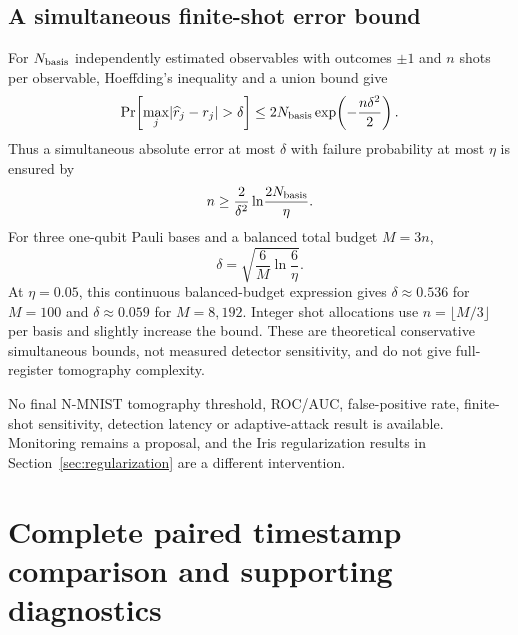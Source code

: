 \documentclass[10pt,onecolumn]{article}
\begin{document}
\subsection{A simultaneous finite-shot error bound}
For $N_{\rm basis}$ independently estimated observables with outcomes $\pm1$ and $n$ shots per observable, Hoeffding's inequality and a union bound give
\begin{equation}
\Pr\!\left[\max_j\lvert\widehat r_j-r_j\rvert>\delta\right]
\leq 2N_{\rm basis}\exp\!\left(-\frac{n\delta^2}{2}\right).
\label{eq:hoeffdingtail}
\end{equation}
Thus a simultaneous absolute error at most $\delta$ with failure probability at most $\eta$ is ensured by
\begin{equation}
n\geq\frac{2}{\delta^2}\ln\!\frac{2N_{\rm basis}}{\eta}.
\label{eq:shots}
\end{equation}
For three one-qubit Pauli bases and a balanced total budget $M=3n$,
\begin{equation}
\delta=\sqrt{\frac{6}{M}\ln\!\frac{6}{\eta}}.
\label{eq:balancedshots}
\end{equation}
At $\eta=0.05$, this continuous balanced-budget expression gives $\delta\approx0.536$ for $M=100$ and $\delta\approx0.059$ for $M=8{,}192$. Integer shot allocations use $n=\lfloor M/3\rfloor$ per basis and slightly increase the bound. These are theoretical conservative simultaneous bounds, not measured detector sensitivity, and do not give full-register tomography complexity.

No final N-MNIST tomography threshold, ROC/AUC, false-positive rate, finite-shot sensitivity, detection latency or adaptive-attack result is available. Monitoring remains a proposal, and the Iris regularization results in Section~\ref{sec:regularization} are a different intervention.

\section{Complete paired timestamp comparison and supporting diagnostics}
\label{sec:paired}
\end{document}
